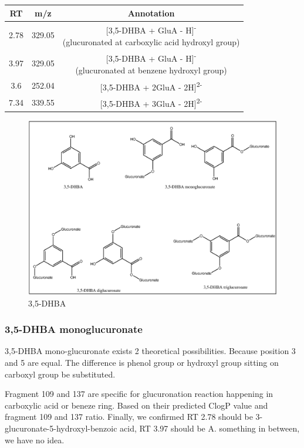 \begin{tabular}{|c|c|c|}
	\hline 
	RT & m/z & Annotation \\ 
	\hline 
	2.78 & 329.05 & \makecell{[3,5-DHBA + GluA - H]\textsuperscript{-}\\(glucuronated at carboxylic acid hydroxyl group)} \\ 
	\hline 
	3.97 & 329.05 & \makecell{[3,5-DHBA + GluA - H]\textsuperscript{-}\\ (glucuronated at benzene hydroxyl group)} \\ 
	\hline 
	3.6 & 252.04 & [3,5-DHBA + 2GluA - 2H]\textsuperscript{2-} \\ 
	\hline 
	7.34 & 339.55 & [3,5-DHBA + 3GluA - 2H]\textsuperscript{2-}\\ 
	\hline 
\end{tabular} 
\begin{figure}[h!]
	\centering
	\includegraphics[width=1\linewidth]{picture/3,5-DHBA-glca-all}
	\caption{3,5-DHBA}
	\label{fig:35-dhba-all}
\end{figure}


\subsubsection{3,5-DHBA monoglucuronate}
3,5-DHBA mono-glucuronate exists 2 theoretical possibilities. Because position 3 and 5 are equal. The difference is phenol group or hydroxyl group sitting on carboxyl group be substituted.

Fragment 109 and 137 are specific for glucuronation reaction happening in carboxylic acid or beneze ring. Based on their predicted ClogP value and fragment 109 and 137 ratio. Finally, we confirmed RT 2.78 should be 3-glucuronate-5-hydroxyl-benzoic acid, RT 3.97 should be A. something in between, we have no idea.


